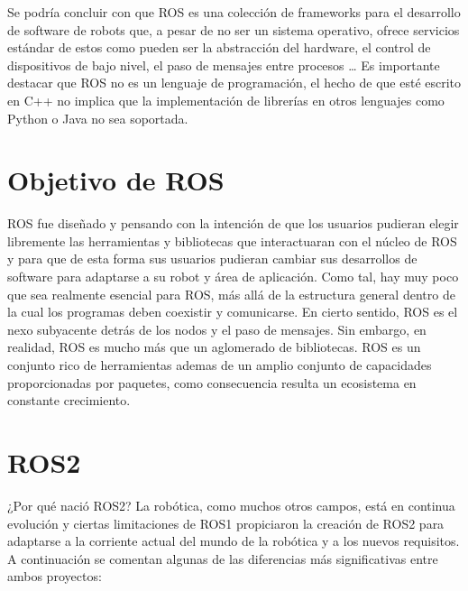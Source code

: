 Se podría concluir con que ROS es una colección de frameworks para el desarrollo de software de robots que, a pesar de no ser un sistema operativo, ofrece servicios estándar de estos como pueden ser la abstracción del hardware, el control de dispositivos de bajo nivel, el paso de mensajes entre procesos … Es importante destacar que ROS no es un lenguaje de programación, el hecho de que esté escrito en C++ no implica que la implementación de librerías en otros lenguajes como Python o Java no sea soportada.

\section{Objetivo de ROS}

ROS fue diseñado y pensando con la intención de que los usuarios pudieran elegir libremente las herramientas y bibliotecas que interactuaran con el núcleo de ROS y para que de esta forma sus usuarios pudieran cambiar sus desarrollos de software para adaptarse a su robot y área de aplicación. Como tal, hay muy poco que sea realmente esencial para ROS, más allá de la estructura general dentro de la cual los programas deben coexistir y comunicarse. En cierto sentido, ROS es el nexo subyacente detrás de los nodos y el paso de mensajes. Sin embargo, en realidad, ROS es mucho más que un aglomerado de bibliotecas. ROS es un conjunto rico de herramientas ademas de un amplio conjunto de capacidades proporcionadas por paquetes, como consecuencia resulta un ecosistema en constante crecimiento. 

\section{ROS2}

¿Por qué nació ROS2? La robótica, como muchos otros campos, está en continua evolución y ciertas limitaciones de ROS1 propiciaron la creación de ROS2 para adaptarse a la corriente actual del mundo de la robótica y a los nuevos requisitos. A continuación se comentan algunas de las diferencias más significativas entre ambos proyectos:

